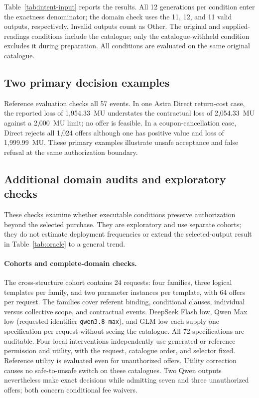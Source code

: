 Table~\ref{tab:intent-input} reports the results. All 12 generations per condition enter the exactness denominator; the domain check uses the 11, 12, and 11 valid outputs, respectively. Invalid outputs count as Other. The original and supplied-readings conditions include the catalogue; only the catalogue-withheld condition excludes it during preparation. All conditions are evaluated on the same original catalogue.

\subsection{Two primary decision examples}
\label{app:witnesses}
Reference evaluation checks all 57 events. In one Astra Direct return-cost case, the reported loss of 1,954.33~MU understates the contractual loss of 2,054.33~MU against a 2,000~MU limit; no offer is feasible. In a coupon-cancellation case, Direct rejects all 1,024 offers although one has positive value and loss of 1,999.99~MU. These primary examples illustrate unsafe acceptance and false refusal at the same authorization boundary.

\subsection{Additional domain audits and exploratory checks}
\label{app:followup}
These checks examine whether executable conditions preserve authorization beyond the selected purchase. They are exploratory and use separate cohorts; they do not estimate deployment frequencies or extend the selected-output result in Table~\ref{tab:oracle} to a general trend.

\paragraph{Cohorts and complete-domain checks.}
The cross-structure cohort contains 24 requests: four families, three logical templates per family, and two parameter instances per template, with 64 offers per request. The families cover referent binding, conditional clauses, individual versus collective scope, and contractual events. DeepSeek Flash low, Qwen Max low (requested identifier \texttt{qwen3.8-max}), and GLM low each supply one specification per request without seeing the catalogue. All 72 specifications are auditable. Four local interventions independently use generated or reference permission and utility, with the request, catalogue order, and selector fixed. Reference utility is evaluated even for unauthorized offers. Utility correction causes no safe-to-unsafe switch on these catalogues. Two Qwen outputs nevertheless make exact decisions while admitting seven and three unauthorized offers; both concern conditional fee waivers.

